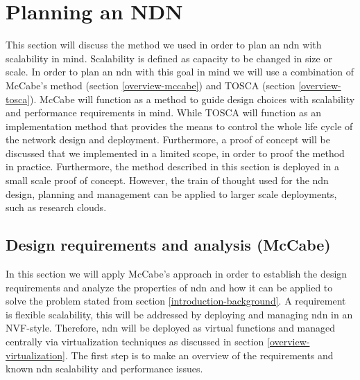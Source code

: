 \section{Planning an NDN}
\label{planning-ndn}
This section will discuss the method we used in order to plan an \gls{ndn} with scalability in mind. Scalability is defined as capacity to be changed in size or scale. In order to plan an \gls{ndn} with this goal in mind we will use a combination of McCabe's method (section \ref{overview-mccabe}) and TOSCA (section \ref{overview-tosca}). McCabe will function as a method to guide design choices with scalability and performance requirements in mind. While TOSCA will function as an implementation method that provides the means to control the whole life cycle of the network design and deployment. Furthermore, a proof of concept will be discussed that we implemented in a limited scope, in order to proof the method in practice. Furthermore, the method described in this section is deployed in a small scale proof of concept. However, the train of thought used for the \gls{ndn} design, planning and management can be applied to larger scale deployments, such as research clouds.

\subsection{Design requirements and analysis (McCabe)}
\label{planning-requirements}
In this section we will apply McCabe's approach in order to establish the design requirements and analyze the properties of \gls{ndn} and how it can be applied to solve the problem stated from section \ref{introduction-background}. A requirement is flexible scalability, this will be addressed by deploying and managing \gls{ndn} in an NVF-style. Therefore, \gls{ndn} will be deployed as virtual functions and managed centrally via virtualization techniques as discussed in section \ref{overview-virtualization}. The first step is to make an overview of the requirements and known \gls{ndn} scalability and performance issues.

